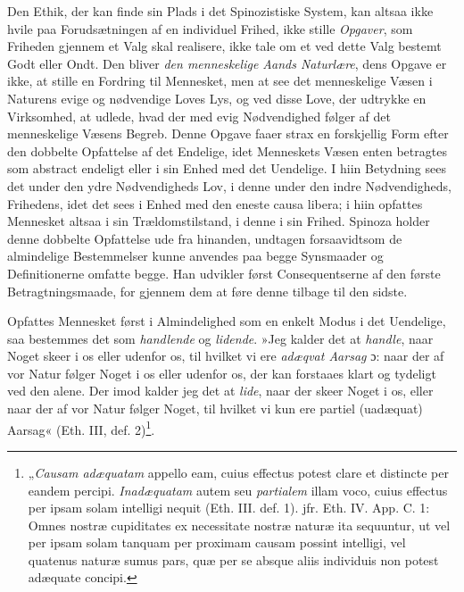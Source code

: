 \documentclass[12pt,a4paper]{book}
\newcommand{\opage}[1]{\marginnote{\footnotesize\textit{[#1]}}}
\begin{document}
Den Ethik, der kan finde sin Plads i det Spinozistiske
System, kan altsaa ikke hvile paa Forudsætningen af en
individuel Frihed, ikke stille \emph{Opgaver}, som Friheden
gjennem et Valg skal realisere, ikke tale om et ved dette
Valg bestemt Godt eller Ondt. Den bliver \emph{den
menneskelige Aands Naturlære}, dens Opgave er ikke, at stille
en Fordring til Mennesket, men at see det menneskelige
Væsen i Naturens evige og nødvendige Loves Lys, og ved
disse Love, der udtrykke en Virksomhed, at udlede, hvad
der med evig Nødvendighed følger af det menneskelige
Væsens Begreb. Denne Opgave faaer strax en forskjellig
Form efter den dobbelte Opfattelse af det Endelige, idet
Menneskets Væsen enten betragtes som abstract endeligt
eller i sin Enhed med det Uendelige. I hiin Betydning sees
det under den ydre Nødvendigheds Lov, i denne under den
indre Nødvendigheds, Frihedens, idet det sees i Enhed med
den eneste causa libera; i hiin opfattes Mennesket altsaa i
sin Trældomstilstand, i denne i sin Frihed. Spinoza holder
denne dobbelte Opfattelse ude fra hinanden, undtagen
forsaavidtsom de almindelige Bestemmelser kunne anvendes
paa begge Synsmaader og Definitionerne omfatte begge.
Han udvikler først Consequentserne af den første
Betragtningsmaade, for gjennem dem at føre denne tilbage til
den sidste.

Opfattes Mennesket først i Almindelighed som en enkelt
Modus i det Uendelige, saa bestemmes det som \emph{handlende}
og \emph{lidende}. »Jeg kalder det at \emph{handle}, naar Noget skeer
i os eller udenfor os, til hvilket vi ere \emph{adæqvat Aarsag}
\opage{111} \setcounter{footnote}{0}%
ɔ: naar der af vor Natur følger Noget i os eller udenfor
os, der kan forstaaes klart og tydeligt ved den alene. Der\-%
imod kalder jeg det at \emph{lide}, naar der skeer Noget i os,
eller naar der af vor Natur følger Noget, til hvilket vi kun
ere partiel (uadæquat) Aarsag« (Eth. III, def.
2)\footnote{„\emph{Causam adæquatam} appello eam, cuius effectus
potest clare et distincte per eandem percipi. \emph{Inadæquatam}
autem seu \emph{partialem} illam voco, cuius effectus per ipsam
solam intelligi nequit (Eth. III. def. 1). jfr. Eth. IV. App. C.
1: Omnes nostræ cupiditates ex necessitate nostræ naturæ ita
sequuntur, ut vel per ipsam solam tanquam per proximam
causam possint intelligi, vel quatenus naturæ sumus pars,
quæ per se absque aliis individuis non potest adæquate
concipi.}.
\end{document}
